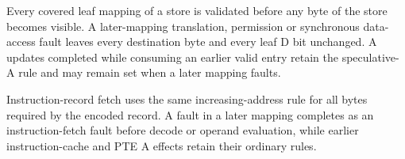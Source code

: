 Every covered leaf mapping of a store is validated before any byte of the store becomes visible. A later-mapping translation,
permission or synchronous data-access fault leaves every destination byte and every leaf D bit
unchanged. A updates completed while consuming an earlier valid entry retain the speculative-A rule and may remain
set when a later mapping faults.

Instruction-record fetch uses the same increasing-address rule for all bytes required by the encoded record. A fault
in a later mapping completes as an instruction-fetch fault before decode or operand evaluation, while earlier
instruction-cache and PTE A effects retain their ordinary rules.
